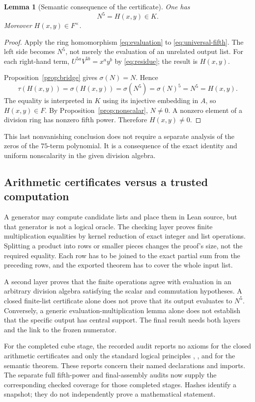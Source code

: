 \documentclass[11pt,letterpaper]{article}
\newtheorem{lemma}[theorem]{Lemma}
\theoremstyle{definition}
\theoremstyle{remark}
\newcommand{\code}[1]{\texttt{\detokenize{#1}}}
\begin{document}
\begin{lemma}[Semantic consequence of the certificate]\label{lem:fifth-semantic}
One has
\[
N^5=H(x,y)\in K.
\]
Moreover $H(x,y)\in F^\times$.
\end{lemma}
\begin{proof}
Apply the ring homomorphism \eqref{eq:evaluation} to
\eqref{eq:universal-fifth}. The left side becomes $N^5$, not merely the
evaluation of an unrelated output list. For each right-hand term,
$U^{5a}V^{5b}=x^ay^b$ by \eqref{eq:residue}; the result is $H(x,y)$.

Proposition~\ref{prop:bridge} gives $\sigma(N)=N$. Hence
\[
\tau(H(x,y))=\sigma(H(x,y))=\sigma(N^5)=\sigma(N)^5=N^5=H(x,y).
\]
The equality is interpreted in $K$ using its injective embedding in $A$,
so $H(x,y)\in F$. By Proposition~\ref{prop:nonscalar}, $N\ne0$.
A nonzero element of a division ring has nonzero fifth power. Therefore
$H(x,y)\ne0$.
\end{proof}

This last nonvanishing conclusion does not require a separate analysis of
the zeros of the $75$-term polynomial. It is a consequence of the exact
identity and uniform nonscalarity in the given division algebra.

\subsection{Arithmetic certificates versus a trusted computation}

A generator may compute candidate lists and place them in Lean source,
but that generator is not a logical oracle. The checking layer proves
finite multiplication equalities by kernel reduction of exact integer
and list operations. Splitting a product into rows or smaller pieces
changes the proof's size, not the required equality. Each row has to be
joined to the exact partial sum from the preceding rows, and the exported
theorem has to cover the whole input list.

A second layer proves that the finite operations agree with evaluation in
an arbitrary division algebra satisfying the scalar and commutation
hypotheses. A closed finite-list certificate alone does not prove that its
output evaluates to $N^5$. Conversely, a generic evaluation-multiplication
lemma alone does not establish that the specific output has central support.
The final result needs both layers and the link to the frozen numerator.

For the completed cube stage, the recorded audit reports no axioms for the
closed arithmetic certificates and only the standard logical principles
\code{propext}, \code{Classical.choice}, and \code{Quot.sound} for the
semantic theorem. These reports concern their named declarations and
imports. The separate full fifth-power and final-assembly audits now supply the
corresponding checked coverage for those completed stages. Hashes identify a snapshot; they do not independently
prove a mathematical statement.
\end{document}
